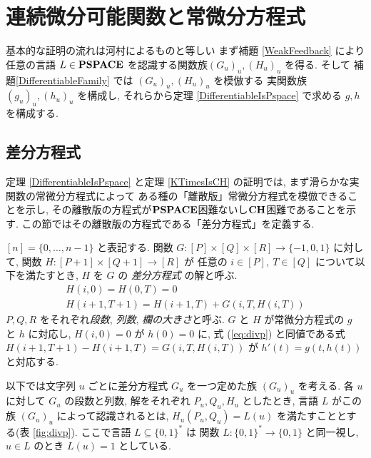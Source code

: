 \section{連続微分可能関数と常微分方程式}
\label{section:differentiable}

基本的な証明の流れは河村によるものと等しい \cite{Kawamura2010lipschitz}
まず補題 \ref{WeakFeedback} により任意の言語
$L \in \mathbf{PSPACE}$ を認識する関数族$(G_u)_u, (H_u)_u$ を得る.
そして 補題\ref{DifferentiableFamily} では $(G_u)_u, (H_u)_u$ を模倣する
実関数族 $(g_u)_u, (h_u)_u$ を構成し,
それらから定理 \ref{DifferentiableIsPspace} で求める $g, h$を構成する.



\subsection{差分方程式}
\label{section:divp}

定理 \ref{DifferentiableIsPspace} と定理 \ref{KTimesIsCH} の証明では,
まず滑らかな実関数の常微分方程式によって
ある種の「離散版」常微分方程式を模倣できることを示し, 
その離散版の方程式が$\mathbf{PSPACE}$困難ないし$\mathbf{CH}$困難であることを示す.
この節ではその離散版の方程式である「差分方程式」を定義する.

$[n] = \{0, \dots , n-1\}$ と表記する.
関数 $G \colon [P] \times [Q] \times [R] \to \{-1, 0, 1\}$ に対して,
関数 $H \colon [P + 1] \times [Q+1] \to [R]$ が
任意の $i \in [P],\ T \in [Q]$ について以下を満たすとき,
$H$ を $G$ の \emph{差分方程式} の解と呼ぶ.
\begin{gather}
   H(i, 0) = H(0, T) = 0 
\\
   H(i + 1, T + 1) = H(i+1, T) + G(i, T, H(i, T))  \label{eq:divp}
\end{gather}
$P, Q, R$ をそれぞれ\emph{段数}, \emph{列数}, \emph{欄の大きさ}と呼ぶ.
$G$ と $H$ が常微分方程式の $g$ と $h$ に対応し,
$H(i, 0) = 0$ が $h(0) = 0$ に,
式 (\ref{eq:divp}) と同値である式 $H(i + 1, T + 1) - H(i+1, T) = G(i, T, H(i, T))$
が $h'(t) = g(t, h(t))$ と対応する.

以下では文字列 $u$ ごとに差分方程式 $G _u$ を一つ定めた族 $(G _u) _u$ を考える. 
各 $u$ に対して $G_u$ の段数と列数, 解をそれぞれ $P_u, Q_u, H_u$ としたとき,
言語 $L$ がこの族 $(G_u)_u$ によって認識されるとは,
$H_u(P_u, Q_u) = L(u)$ を満たすこととする(表 \ref{fig:divp}).
ここで言語 $L \subseteq \{0, 1\} ^*$ は
関数 $L \colon \{0, 1\} ^* \to \{0, 1\}$ と同一視し, 
$u \in L$ のとき $L (u) = 1$ としている. 

